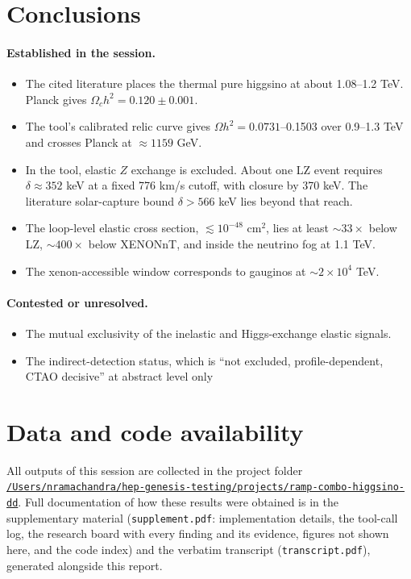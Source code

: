 \documentclass[11pt,a4paper]{article}
\begin{document}
\section{Conclusions}
\paragraph{Established in the session.}
\begin{itemize}
\item The cited literature places the thermal pure higgsino at about 1.08--1.2 TeV. Planck gives $\Omega_c h^2=0.120\pm0.001$.
\item The tool's calibrated relic curve gives $\Omega h^2=0.0731$--0.1503 over 0.9--1.3 TeV and crosses Planck at $\approx1159$ GeV.
\item In the tool, elastic $Z$ exchange is excluded. About one LZ event requires $\delta\approx352$ keV at a fixed 776 km/s cutoff, with closure by 370 keV. The literature solar-capture bound $\delta>566$ keV lies beyond that reach.
\item The loop-level elastic cross section, $\lesssim10^{-48}$ cm$^2$, lies at least $\sim33\times$ below LZ, $\sim400\times$ below XENONnT, and inside the neutrino fog at 1.1 TeV.
\item The xenon-accessible window corresponds to gauginos at $\sim2\times10^4$ TeV.
\end{itemize}

\paragraph{Contested or unresolved.}
\begin{itemize}
\item The mutual exclusivity of the inelastic and Higgs-exchange elastic signals.
\item The indirect-detection status, which is ``not excluded, profile-dependent, CTAO decisive'' at abstract level only
\end{itemize}

\section*{Data and code availability}
All outputs of this session are collected in the project folder \href{file:///Users/nramachandra/hep-genesis-testing/projects/ramp-combo-higgsino-dd}{\texttt{/\allowbreak{}Users/\allowbreak{}nramachandra/\allowbreak{}hep-genesis-testing/\allowbreak{}projects/\allowbreak{}ramp-combo-higgsino-dd}}.
Full documentation of how these results were obtained is in the supplementary material (\texttt{supplement.pdf}: implementation details, the tool-call log, the research board with every finding and its evidence, figures not shown here, and the code index) and the verbatim transcript (\texttt{transcript.pdf}), generated alongside this report.
\end{document}
